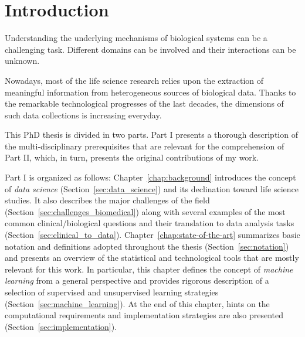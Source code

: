 
\chapter{Introduction} \label{chapter:introduction}
Understanding the underlying mechanisms of biological systems can be a challenging task. Different domains can be involved and their interactions can be unknown.

Nowadays, most of the life science research relies upon the extraction of meaningful information from heterogeneous sources of biological data. Thanks to the remarkable technological progresses of the last decades, the dimensions of such data collections is increasing everyday.





This PhD thesis is divided in two parts. Part I presents a thorough description of the multi-disciplinary prerequisites that are relevant for the comprehension of Part II, which, in turn, presents the original contributions of my work.

Part I is organized as follows: Chapter~\ref{chap:background} introduces the concept of \textit{data science} (Section~\ref{sec:data_science}) and its declination toward life science studies. It also describes the major challenges of the field (Section~\ref{sec:challenges_biomedical}) along with several examples of the most common clinical/biological questions and their translation to data analysis tasks (Section~\ref{sec:clinical_to_data}).
Chapter~\ref{chap:state-of-the-art} summarizes basic notation and definitions adopted throughout the thesis (Section~\ref{sec:notation}) and presents an overview of the statistical and technological tools that are mostly relevant for this work. In particular, this chapter defines the concept of \textit{machine learning} from a general perspective and provides rigorous description of a selection of supervised and unsupervised learning strategies (Section~\ref{sec:machine_learning}). At the end of this chapter, hints on the computational requirements and implementation strategies are also presented (Section~\ref{sec:implementation}).

